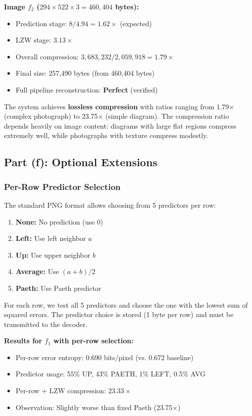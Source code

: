 \documentclass[11pt,a4paper]{article}
\begin{document}
\textbf{Image $f_2$ ($294 \times 522 \times 3 = 460,404$ bytes):}
\begin{itemize}
    \item Prediction stage: $8 / 4.94 = 1.62\times$ (expected)
    \item LZW stage: $3.13\times$
    \item Overall compression: $3,683,232 / 2,059,918 = \mathbf{1.79\times}$
    \item Final size: 257,490 bytes (from 460,404 bytes)
    \item Full pipeline reconstruction: \textbf{Perfect} (verified)
\end{itemize}

The system achieves \textbf{lossless compression} with ratios ranging from 1.79$\times$ (complex photograph) to 23.75$\times$ (simple diagram). The compression ratio depends heavily on image content: diagrams with large flat regions compress extremely well, while photographs with texture compress modestly.

\subsection{Part (f): Optional Extensions}

\subsubsection{Per-Row Predictor Selection}
The standard PNG format allows choosing from 5 predictors per row:
\begin{enumerate}
    \item \textbf{None:} No prediction (use 0)
    \item \textbf{Left:} Use left neighbor $a$
    \item \textbf{Up:} Use upper neighbor $b$
    \item \textbf{Average:} Use $(a + b) / 2$
    \item \textbf{Paeth:} Use Paeth predictor
\end{enumerate}

For each row, we test all 5 predictors and choose the one with the lowest sum of squared errors. The predictor choice is stored (1 byte per row) and must be transmitted to the decoder.

\textbf{Results for $f_1$ with per-row selection:}
\begin{itemize}
    \item Per-row error entropy: 0.690 bits/pixel (vs. 0.672 baseline)
    \item Predictor usage: 55\% UP, 43\% PAETH, 1\% LEFT, 0.5\% AVG
    \item Per-row + LZW compression: $23.33\times$
    \item Observation: Slightly worse than fixed Paeth (23.75$\times$)
\end{itemize}
\end{document}
